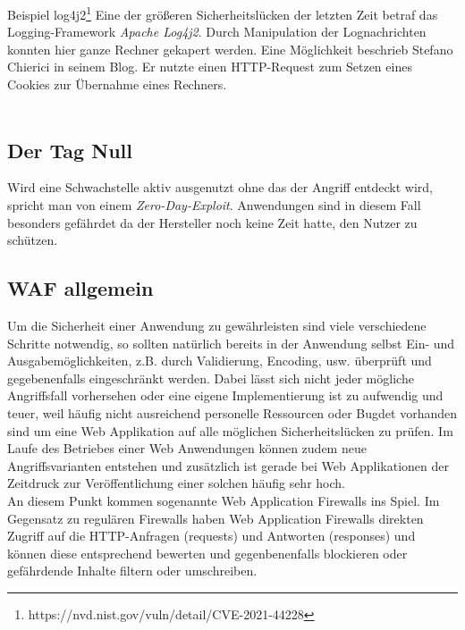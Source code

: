 \textcolor{bhtGray}{ Beispiel log4j2\footnote{https://nvd.nist.gov/vuln/detail/CVE-2021-44228}} Eine der größeren Sicherheitslücken der letzten Zeit betraf das Logging-Framework \emph{Apache Log4j2}. Durch Manipulation der Lognachrichten konnten hier ganze Rechner gekapert werden. Eine Möglichkeit beschrieb Stefano Chierici in seinem Blog\cite{chierici2021}. Er nutzte einen HTTP-Request zum Setzen eines Cookies zur Übernahme eines Rechners.\\\\


\subsection{Der Tag Null}

Wird eine Schwachstelle aktiv ausgenutzt ohne das der Angriff entdeckt wird, spricht man von einem \glqq\emph{Zero-Day-Exploit}\grqq. Anwendungen sind in diesem Fall besonders gefährdet da der Hersteller  noch keine Zeit hatte, den Nutzer zu schützen\cite{bsi0day}. 

\subsection{WAF allgemein}
Um die Sicherheit einer Anwendung zu gewährleisten sind viele verschiedene Schritte notwendig, so sollten natürlich bereits in der Anwendung selbst Ein- und Ausgabemöglichkeiten, z.B. durch Validierung, Encoding, usw. überprüft und gegebenenfalls eingeschränkt werden. Dabei lässt sich nicht jeder mögliche Angriffsfall vorhersehen oder eine eigene Implementierung ist zu aufwendig und teuer, weil häufig nicht ausreichend personelle Ressourcen oder Bugdet vorhanden sind um eine Web Applikation auf alle möglichen Sicherheitslücken zu prüfen. Im Laufe des Betriebes einer Web Anwendungen können zudem neue Angriffsvarianten entstehen und zusätzlich ist gerade bei Web Applikationen der Zeitdruck zur Veröffentlichung einer solchen häufig sehr hoch.\\

An diesem Punkt kommen sogenannte Web Application Firewalls ins Spiel. Im Gegensatz zu regulären Firewalls haben Web Application Firewalls direkten Zugriff auf die HTTP-Anfragen (requests) und Antworten (responses) und können diese entsprechend bewerten und gegenbenenfalls blockieren oder gefährdende Inhalte filtern oder umschreiben.\\

